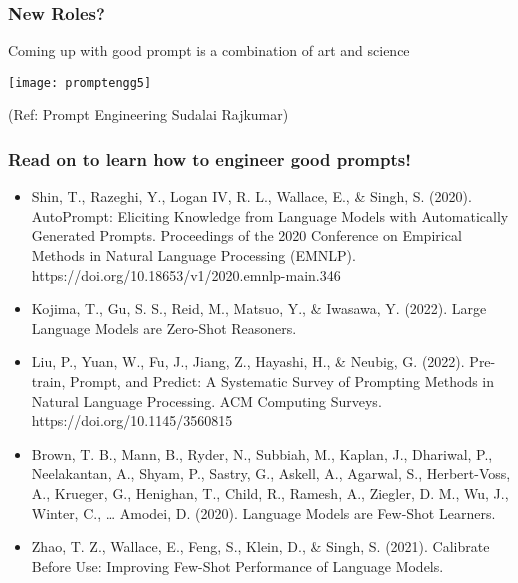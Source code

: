 \begin{frame}[fragile]\frametitle{New Roles?}

Coming up with good prompt is a combination of art and science

\begin{center}
\texttt{[image: promptengg5]}

{\tiny (Ref: Prompt Engineering Sudalai Rajkumar)}

\end{center}		
		


\end{frame}


\begin{frame}[fragile]\frametitle{Read on to learn how to engineer good prompts!}

\begin{itemize}
\item Shin, T., Razeghi, Y., Logan IV, R. L., Wallace, E., \& Singh, S. (2020). AutoPrompt: Eliciting Knowledge from Language Models with Automatically Generated Prompts. Proceedings of the 2020 Conference on Empirical Methods in Natural Language Processing (EMNLP). https://doi.org/10.18653/v1/2020.emnlp-main.346 
\item Kojima, T., Gu, S. S., Reid, M., Matsuo, Y., \& Iwasawa, Y. (2022). Large Language Models are Zero-Shot Reasoners. 
\item Liu, P., Yuan, W., Fu, J., Jiang, Z., Hayashi, H., \& Neubig, G. (2022). Pre-train, Prompt, and Predict: A Systematic Survey of Prompting Methods in Natural Language Processing. ACM Computing Surveys. https://doi.org/10.1145/3560815 
\item Brown, T. B., Mann, B., Ryder, N., Subbiah, M., Kaplan, J., Dhariwal, P., Neelakantan, A., Shyam, P., Sastry, G., Askell, A., Agarwal, S., Herbert-Voss, A., Krueger, G., Henighan, T., Child, R., Ramesh, A., Ziegler, D. M., Wu, J., Winter, C., … Amodei, D. (2020). Language Models are Few-Shot Learners. 
\item Zhao, T. Z., Wallace, E., Feng, S., Klein, D., \& Singh, S. (2021). Calibrate Before Use: Improving Few-Shot Performance of Language Models.
\end{itemize}
\end{frame}



